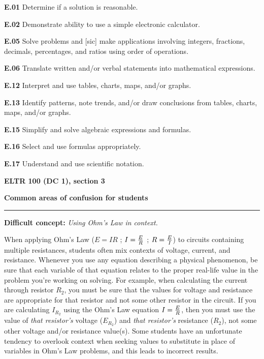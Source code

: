 \item{\bf E.01} Determine if a solution is reasonable.
\item{\bf E.02} Demonstrate ability to use a simple electronic calculator.
\item{\bf E.05} Solve problems and [sic] make applications involving integers, fractions, decimals, percentages, and ratios using order of operations.
\item{\bf E.06} Translate written and/or verbal statements into mathematical expressions.
\item{\bf E.12} Interpret and use tables, charts, maps, and/or graphs.
\item{\bf E.13} Identify patterns, note trends, and/or draw conclusions from tables, charts, maps, and/or graphs.
\item{\bf E.15} Simplify and solve algebraic expressions and formulas.
\item{\bf E.16} Select and use formulas appropriately.
\item{\bf E.17} Understand and use scientific notation.
\medskip






\vfil \eject

\centerline{\bf ELTR 100 (DC 1), section 3} \bigskip 
 
\vskip 10pt

\noindent
{\bf Common areas of confusion for students}

\vskip 5pt

\hrule \vskip 5pt

\vskip 10pt

\noindent
{\bf Difficult concept: } {\it Using Ohm's Law in context.}

When applying Ohm's Law ($E = IR$ ; $I = {E \over R}$ ; $R = {E \over I}$) to circuits containing multiple resistances, students often mix contexts of voltage, current, and resistance.  Whenever you use any equation describing a physical phenomenon, be sure that each variable of that equation relates to the proper real-life value in the problem you're working on solving.  For example, when calculating the current through resistor $R_2$, you must be sure that the values for voltage and resistance are appropriate for that resistor and not some other resistor in the circuit.  If you are calculating $I_{R_2}$ using the Ohm's Law equation $I = {E \over R}$, then you must use the value of {\it that resistor's} voltage ($E_{R_2}$) and {\it that resistor's} resistance ($R_2$), not some other voltage and/or resistance value(s).  Some students have an unfortunate tendency to overlook context when seeking values to substitute in place of variables in Ohm's Law problems, and this leads to incorrect results.

